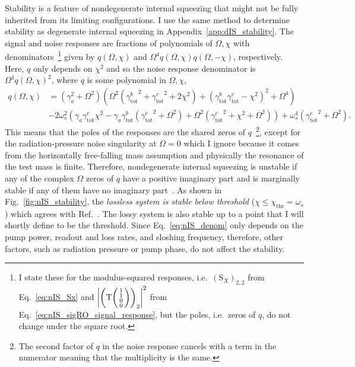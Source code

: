 Stability is a feature of nondegenerate internal squeezing that might not be fully inherited from its limiting configurations. I use the same method to determine stability as degenerate internal squeezing in Appendix~\ref{app:dIS_stability}. The signal and noise responses are fractions of polynomials of $\Omega, \chi$ with denominators~\footnote{I state these for the modulus-squared responses, i.e.\ $(\text{S}_X)_{2,2}$ from Eq.~\ref{eq:nIS_Sx} and $\abs{\left(\text{T}\begin{psmallmatrix}1 \\1\\0\\0\end{psmallmatrix}\right)_2}^2$ from Eq.~\ref{eq:nIS_sigRO_signal_response}, but the poles, i.e.\ zeros of $q$, do not change under the square root.} given by $q(\Omega,\chi)$ and $\Omega^4 q(\Omega,\chi) q(\Omega,-\chi)$, respectively. Here, $q$ only depends on $\chi^2$ and so the noise response denominator is $\Omega^4 q(\Omega,\chi)^2$, where $q$ is some polynomial in $\Omega, \chi$, 
\begin{align}\label{eq:nIS_denom}
q(\Omega,\chi)&=\left(\gamma_a^2+\Omega ^2\right) \left(\Omega ^2 \left({\gamma^b_\text{tot}}^2+{\gamma^c_\text{tot}}^2+2 \chi ^2\right)+\left({\gamma^b_\text{tot}} {\gamma^c_\text{tot}}-\chi ^2\right)^2+\Omega ^4\right)\\
&-2 \omega_s^2 \left(\gamma_a {\gamma^c_\text{tot}} \chi ^2-\gamma_a {\gamma^b_\text{tot}} \left({\gamma^c_\text{tot}}^2+\Omega ^2\right)+\Omega ^2 \left({\gamma^c_\text{tot}}^2+\chi ^2+\Omega ^2\right)\right)+\omega_s^4 \left({\gamma^c_\text{tot}}^2+\Omega ^2\right).\nonumber
\end{align}
This means that the poles of the responses are the shared zeros of $q$~\footnote{The second factor of $q$ in the noise response cancels with a term in the numerator meaning that the multiplicity is the same.}, except for the radiation-pressure noise singularity at $\Omega=0$ which I ignore because it comes from the horizontally free-falling mass assumption and physically the resonance of the test mass is finite. %
Therefore, nondegenerate internal squeezing is unstable if any of the complex $\Omega$ zeros of $q$ have a positive imaginary part and is marginally stable if any of them have no imaginary part~\cite{nise_2019}. As shown in Fig.~\ref{fig:nIS_stability}, the \emph{lossless system is stable below threshold} ($\chi\leq\chi_\text{thr}=\omega_s$) which agrees with Ref.~\cite{liBroadbandSensitivityImprovement2020}. The lossy system is also stable up to a point that I will shortly define to be the threshold. %
Since Eq.~\ref{eq:nIS_denom} only depends on the pump power, readout and loss rates, and sloshing frequency, therefore, other factors, such as radiation pressure or pump phase, do not affect the stability.

